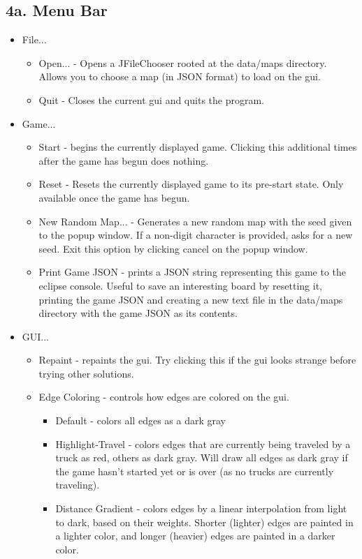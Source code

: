 \documentclass[11pt]{article}
\begin{document}
\subsection{4a. Menu Bar}
\begin{itemize}
\item File...
\begin{itemize}
\item Open... - Opens a JFileChooser rooted at the data/maps directory. Allows you to choose a map (in JSON format) to load on the gui.
\item Quit - Closes the current gui and quits the program.
\end{itemize}
\item Game...
\begin{itemize}
\item Start - begins the currently displayed game. Clicking this additional times after the game has begun does nothing.
\item Reset - Resets the currently displayed game to its pre-start state. Only available once the game has begun.
\item New Random Map... - Generates a new random map with the seed given to the popup window. If a non-digit character is provided, asks for a new seed. Exit this option by clicking cancel on the popup window.
\item Print Game JSON - prints a JSON string representing this game to the eclipse console. Useful to save an interesting board by resetting it, printing the game JSON and creating a new text file in the data/maps directory with the game JSON as its contents.
\end{itemize}
\item GUI...
\begin{itemize}
\item Repaint - repaints the gui. Try clicking this if the gui looks strange before trying other solutions.
\item Edge Coloring - controls how edges are colored on the gui.
\begin{itemize}
\item Default - colors all edges as a dark gray
\item Highlight-Travel - colors edges that are currently being traveled by a truck as red, others as dark gray. Will draw all edges as dark gray if the game hasn't started yet or is over (as no trucks are currently traveling).
\item Distance Gradient - colors edges by a linear interpolation from light to dark, based on their weights. Shorter (lighter) edges are painted in a lighter color, and longer (heavier) edges are painted in a  darker color.
\end{itemize}
\end{itemize}
\end{itemize}
\end{document}
